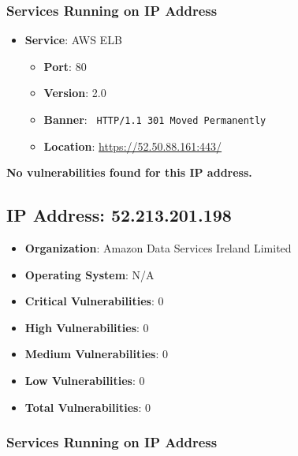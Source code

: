 \documentclass{article}
\begin{document}
\subsubsection*{Services Running on IP Address}

\begin{itemize}
    
        \item \textbf{Service}: AWS ELB
        \begin{itemize}
            \item \textbf{Port}: 80
            \item \textbf{Version}:  2.0 
            \item \textbf{Banner}: \texttt{ HTTP/1.1 301 Moved Permanently
 }
            \item \textbf{Location}: \href{ https://52.50.88.161:443/ }{ https://52.50.88.161:443/ }
        \end{itemize}
    
\end{itemize}


\textbf{No vulnerabilities found for this IP address.}


\clearpage



\subsection*{IP Address: 52.213.201.198}

\begin{itemize}
    \item \textbf{Organization}: Amazon Data Services Ireland Limited
    \item \textbf{Operating System}:  N/A 
    \item \textbf{Critical Vulnerabilities}: 0
    \item \textbf{High Vulnerabilities}: 0
    \item \textbf{Medium Vulnerabilities}: 0
    \item \textbf{Low Vulnerabilities}: 0
    \item \textbf{Total Vulnerabilities}: 0
\end{itemize}

\subsubsection*{Services Running on IP Address}
\end{document}
